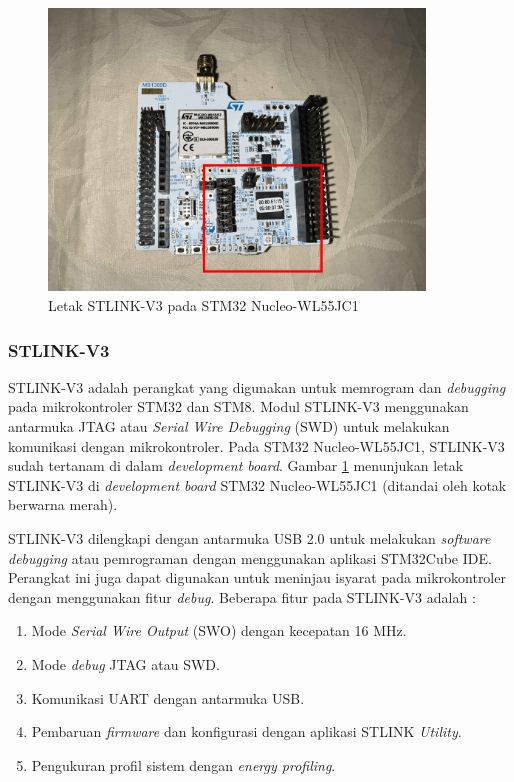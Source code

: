 \begin{figure}[H]
	\centering
	\includegraphics[width=10cm]{contents/chapter-2/stlink-in-wl55.jpg}
	\caption{Letak STLINK-V3 pada STM32 Nucleo-WL55JC1}
	\label{Fig: stlink-in-wl55}
\end{figure}

\subsubsection{STLINK-V3}
STLINK-V3 adalah perangkat yang digunakan untuk memrogram dan \textit{debugging} pada mikrokontroler STM32 dan STM8. Modul STLINK-V3 menggunakan antarmuka JTAG atau \textit{Serial Wire Debugging} (SWD) untuk melakukan komunikasi dengan mikrokontroler. Pada STM32 Nucleo-WL55JC1, STLINK-V3 sudah tertanam di dalam \textit{development board}. Gambar \ref{Fig: stlink-in-wl55} menunjukan letak STLINK-V3 di \textit{development board} STM32 Nucleo-WL55JC1 (ditandai oleh kotak berwarna merah).

STLINK-V3 dilengkapi dengan antarmuka USB 2.0 untuk melakukan \textit{software debugging} atau pemrograman dengan menggunakan aplikasi STM32Cube IDE. Perangkat ini juga dapat digunakan untuk meninjau isyarat pada mikrokontroler dengan menggunakan fitur \textit{debug}. Beberapa fitur pada STLINK-V3 adalah \cite{STMicroelectronics2023a}:

\begin{enumerate}
	\item Mode \textit{Serial Wire Output} (SWO) dengan kecepatan 16 MHz.
	\item Mode \textit{debug} JTAG atau SWD.
	\item Komunikasi UART dengan antarmuka USB.
	\item Pembaruan \textit{firmware} dan konfigurasi dengan aplikasi STLINK \textit{Utility}.
	\item Pengukuran profil sistem dengan \textit{energy profiling}.
\end{enumerate}

